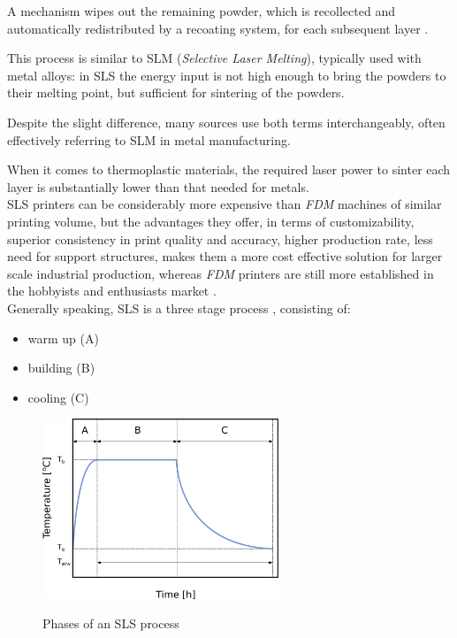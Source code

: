 \documentclass{article}
\begin{document}
    A mechanism wipes out the remaining powder, which is recollected and automatically redistributed by a recoating 
    system, for each subsequent layer \autocite*{Padovano_SLS_Review}. 

    This process is similar to SLM (\textit{Selective Laser Melting}), typically used with metal alloys: in SLS the energy input is not high enough 
    to bring the powders to their melting point, but sufficient for sintering of the powders. 

    Despite the slight difference, many sources use both terms interchangeably, often effectively referring to SLM in metal manufacturing. 
    
    When it comes to thermoplastic materials, the required laser power to sinter each layer is substantially lower than that needed for metals. \\ 

    SLS printers can be considerably more expensive than \textit{FDM} machines of similar printing volume, but the advantages they offer, 
    in terms of customizability, superior consistency in print quality and accuracy, higher production rate, less need for support structures, 
    makes them a more cost effective solution for larger scale industrial production, whereas \textit{FDM} printers are still more established 
    in the hobbyists and enthusiasts market \autocite*{Padovano_SLS_Review}. \\ 

    Generally speaking, SLS is a three stage process \autocites{Padovano_SLS_Review}, consisting of: 
    
    \begin{itemize}
        \item warm up (A)
        \item building (B)
        \item cooling (C)
    \end{itemize}

    \begin{figure}[h!]
        \centering
        \includegraphics[width=0.63\textwidth]{Pictures/SLS_temp_over_time.eps}\\
        \caption{Phases of an SLS process} 
        \label{fig:SLS_temp_over_time}
    \end{figure}
\end{document}
